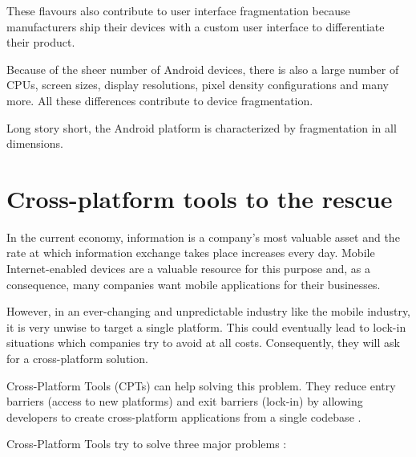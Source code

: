 
These flavours also contribute to user interface fragmentation because manufacturers ship their devices with a custom user interface to differentiate their product.

Because of the sheer number of Android devices, there is also a large  number of CPUs, screen sizes, display resolutions, pixel density configurations and many more. All these differences contribute to device fragmentation. 

Long story short, the Android platform is characterized by fragmentation in all dimensions.

\section{Cross-platform tools to the rescue}

In the current economy, information is a company's most valuable asset and the rate at which information exchange takes place increases every day. Mobile Internet-enabled devices are a valuable resource for this purpose and, as a consequence, many companies want mobile applications for their businesses.

However, in an ever-changing and unpredictable industry like the mobile industry, it is very unwise to target a single platform. This could eventually lead to lock-in situations which companies try to avoid at all costs. Consequently, they will ask for a cross-platform solution. 

Cross-Platform Tools (CPTs) can help solving this problem. They reduce entry barriers (access to new platforms) and exit barriers (lock-in) by allowing developers to create cross-platform applications from a single codebase \cite{VMCPT:2012}. 

Cross-Platform Tools try to solve three major problems \cite{VMCPT:2012}: 

